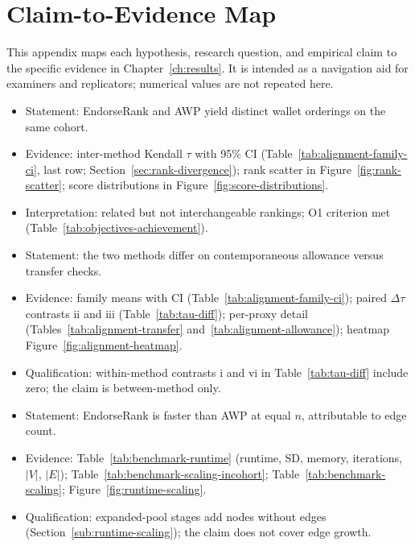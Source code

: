 \section{Claim-to-Evidence Map}
\label{ch:appendix-claims}

This appendix maps each hypothesis, research question, and empirical claim to the specific evidence in Chapter~\ref{ch:results}. It is intended as a navigation aid for examiners and replicators; numerical values are not repeated here.


\begin{itemize}
\item Statement: EndorseRank and AWP yield distinct wallet orderings on the same cohort.
\item Evidence: inter-method Kendall $\tau$ with 95\% CI (Table~\ref{tab:alignment-family-ci}, last row; Section~\ref{sec:rank-divergence}); rank scatter in Figure~\ref{fig:rank-scatter}; score distributions in Figure~\ref{fig:score-distributions}.
\item Interpretation: related but not interchangeable rankings; O1 criterion met (Table~\ref{tab:objectives-achievement}).
\end{itemize}


\begin{itemize}
\item Statement: the two methods differ on contemporaneous allowance versus transfer checks.
\item Evidence: family means with CI (Table~\ref{tab:alignment-family-ci}); paired $\Delta\tau$ contrasts ii and iii (Table~\ref{tab:tau-diff}); per-proxy detail (Tables~\ref{tab:alignment-transfer} and~\ref{tab:alignment-allowance}); heatmap Figure~\ref{fig:alignment-heatmap}.
\item Qualification: within-method contrasts i and vi in Table~\ref{tab:tau-diff} include zero; the claim is between-method only.
\end{itemize}


\begin{itemize}
\item Statement: EndorseRank is faster than AWP at equal $n$, attributable to edge count.
\item Evidence: Table~\ref{tab:benchmark-runtime} (runtime, SD, memory, iterations, $|V|$, $|E|$); Table~\ref{tab:benchmark-scaling-incohort}; Table~\ref{tab:benchmark-scaling}; Figure~\ref{fig:runtime-scaling}.
\item Qualification: expanded-pool stages add nodes without edges (Section~\ref{sub:runtime-scaling}); the claim does not cover edge growth.
\end{itemize}

